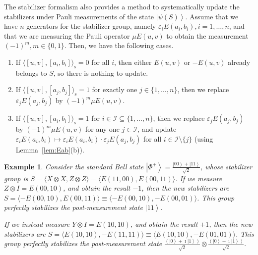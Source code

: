 \documentclass[journal,onecolumn]{IEEEtran}
\newtheorem{example}{Example}
\newcommand{\dket}[1]{\left\lvert #1 \right\rangle}
\newcommand{\syminn}[2]{\langle #1, #2 \rangle_{\text{s}}}
\newif\ifnotes
\newcommand{\narayanan}[1]{\ifnotes{{\color{blue} [Narayanan: #1]}}\fi}
\newcommand{\nithin}[1]{\ifnotes{{\color{magenta} [Nithin: #1]}}\fi}
\newcommand{\bane}[1]{\ifnotes{{\color{dkgreen} [Bane: #1]}}\fi}
\begin{document}
The stabilizer formalism also provides a method to systematically update the stabilizers under Pauli measurements of the state $\dket{\psi(S)}$.
Assume that we have $n$ generators for the stabilizer group, namely $\varepsilon_i E(a_i,b_i), i = 1,\ldots,n$, and that we are measuring the Pauli operator $\mu E(u,v)$ to obtain the measurement $(-1)^m, m \in \{0,1\}$. Then, we have the following cases.


\begin{enumerate}
\item If $\syminn{[u,v]}{[a_i,b_i]} = 0$ for all $i$, then either $E(u,v)$ or $-E(u,v)$ already belongs to $S$, so there is nothing to update.

\item If $\syminn{[u,v]}{[a_j,b_j]} = 1$ for exactly one $j \in \{1,\ldots,n\}$, then we replace $\varepsilon_j E(a_j,b_j)$ by $(-1)^m \mu E(u,v)$.

\item If $\syminn{[u,v]}{[a_i,b_i]} = 1$ for $i \in \mathcal{I} \subseteq \{1,\ldots,n\}$, then we replace $\varepsilon_j E(a_j,b_j)$ by $(-1)^m \mu E(u,v)$ for any one $j \in \mathcal{I}$, and update $\varepsilon_i E(a_i,b_i) \mapsto \varepsilon_i E(a_i,b_i) \cdot \varepsilon_j E(a_j,b_j)$ for all $i \in \mathcal{I} \setminus \{j\}$ (using Lemma~\ref{lem:Eab}(b)).

\end{enumerate}

\begin{example}
\label{eg:measurement}
\normalfont
Consider the standard Bell state $\dket{\Phi^+} = \frac{\dket{00} + \dket{11}}{\sqrt{2}}$, whose stabilizer group is $S = \langle X \otimes X, Z \otimes Z \rangle= \langle E(11,00), E(00,11) \rangle$.
If we measure $Z \otimes I = E(00,10)$, and obtain the result $-1$, then the new stabilizers are $S = \langle -E(00,10), E(00,11) \rangle \equiv \langle -E(00,10), -E(00,01) \rangle$.
This group perfectly stabilizes the post-measurement state $\dket{11}$.

If we instead measure $Y \otimes I = E(10,10)$, and obtain the result $+1$, then the new stabilizers are $S = \langle E(10,10), -E(11,11) \rangle \equiv \langle E(10,10), -E(01,01) \rangle$.
This group perfectly stabilizes the post-measurement state $\frac{(\dket{0} + \imath \dket{1})}{\sqrt{2}} \otimes \frac{(\dket{0} - \imath \dket{1})}{\sqrt{2}}$. \hfill \IEEEQEDhere
\end{example}
\end{document}
